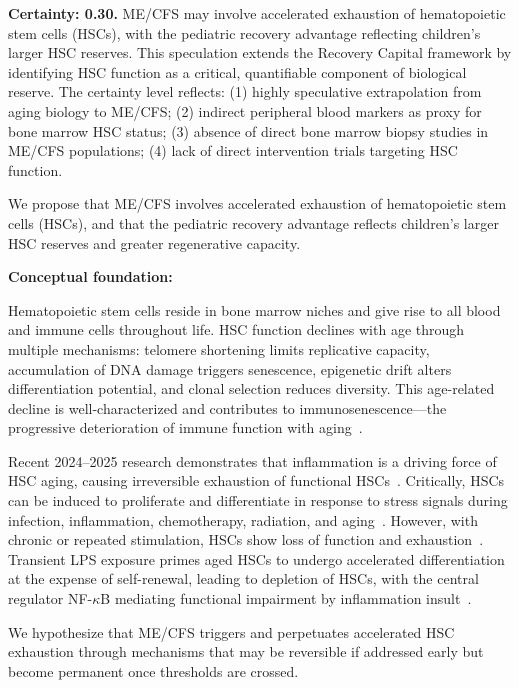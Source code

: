 \begin{speculation}
\label{spec:hsc-exhaustion}

\textbf{Certainty: 0.30.} ME/CFS may involve accelerated exhaustion of hematopoietic stem cells (HSCs), with the pediatric recovery advantage reflecting children's larger HSC reserves. This speculation extends the Recovery Capital framework by identifying HSC function as a critical, quantifiable component of biological reserve. The certainty level reflects: (1) highly speculative extrapolation from aging biology to ME/CFS; (2) indirect peripheral blood markers as proxy for bone marrow HSC status; (3) absence of direct bone marrow biopsy studies in ME/CFS populations; (4) lack of direct intervention trials targeting HSC function.

We propose that ME/CFS involves accelerated exhaustion of hematopoietic stem cells (HSCs), and that the pediatric recovery advantage reflects children's larger HSC reserves and greater regenerative capacity.

\textbf{Conceptual foundation:}

Hematopoietic stem cells reside in bone marrow niches and give rise to all blood and immune cells throughout life. HSC function declines with age through multiple mechanisms: telomere shortening limits replicative capacity, accumulation of DNA damage triggers senescence, epigenetic drift alters differentiation potential, and clonal selection reduces diversity. This age-related decline is well-characterized and contributes to immunosenescence---the progressive deterioration of immune function with aging~\cite{NatureCellBio2025haematopoietic,FrontHematology2025aging}.

Recent 2024--2025 research demonstrates that inflammation is a driving force of HSC aging, causing irreversible exhaustion of functional HSCs~\cite{JExpMed2021inflammation}. Critically, HSCs can be induced to proliferate and differentiate in response to stress signals during infection, inflammation, chemotherapy, radiation, and aging~\cite{ExpHematology2020protection}. However, with chronic or repeated stimulation, HSCs show loss of function and exhaustion~\cite{ExpHematology2020protection}. Transient LPS exposure primes aged HSCs to undergo accelerated differentiation at the expense of self-renewal, leading to depletion of HSCs, with the central regulator NF-$\kappa$B mediating functional impairment by inflammation insult~\cite{JExpMed2021inflammation}.

We hypothesize that ME/CFS triggers and perpetuates accelerated HSC exhaustion through mechanisms that may be reversible if addressed early but become permanent once thresholds are crossed.


\end{speculation}
